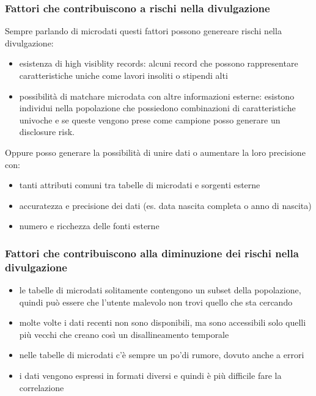 \subsubsection{Fattori che contribuiscono a rischi nella divulgazione}
Sempre parlando di microdati questi fattori possono genereare rischi nella divulgazione:
\begin{itemize}
    \item esistenza di high visiblity records: alcuni record che possono rappresentare caratteristiche uniche come lavori insoliti o stipendi alti
    \item possibilità di matchare microdata con altre informazioni esterne: esistono individui nella popolazione che possiedono combinazioni di caratteristiche univoche e se queste vengono prese come campione posso generare un disclosure risk.
\end{itemize}
Oppure posso generare la possibilità di unire dati o aumentare la loro precisione con:
\begin{itemize}
    \item tanti attributi comuni tra tabelle di microdati e sorgenti esterne
    \item accuratezza e precisione dei dati (es. data nascita completa o anno di nascita)
    \item numero e ricchezza delle fonti esterne
\end{itemize}

\subsubsection{Fattori che contribuiscono alla diminuzione dei rischi nella divulgazione}
\begin{itemize}
    \item le tabelle di microdati solitamente contengono un subset della popolazione, quindi può essere che l'utente malevolo non trovi quello che sta cercando
    \item molte volte i dati recenti non sono disponibili, ma sono accessibili solo quelli più vecchi che creano così un disallineamento temporale
    \item nelle tabelle di microdati c'è sempre un po'di rumore, dovuto anche a errori
    \item i dati vengono espressi in formati diversi e quindi è più difficile fare la correlazione
\end{itemize}

